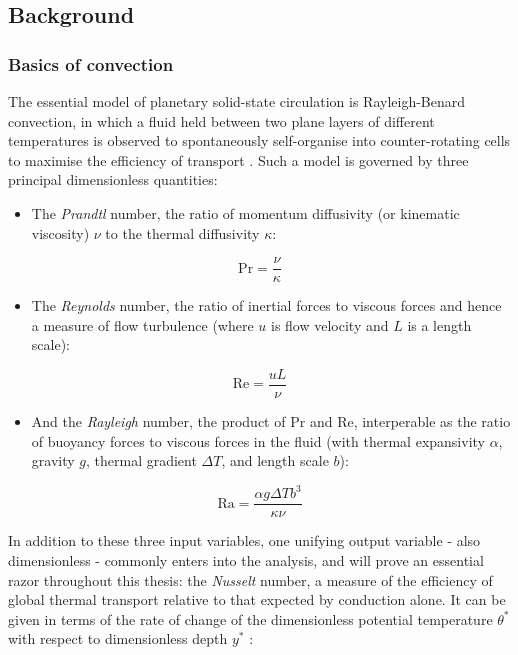 \documentclass[a4paper,11pt,oneside]{book}
\begin{document}
\subsection{Background}

\subsubsection{Basics of convection}

The essential model of planetary solid-state circulation is Rayleigh-Benard convection, in which a fluid held between two plane layers of different temperatures is observed to spontaneously self-organise into counter-rotating cells to maximise the efficiency of transport \cite{Getling1998-gv}. Such a model is governed by three principal dimensionless quantities:

\begin{itemize}
\item The \textit{Prandtl} number, the ratio of momentum diffusivity (or kinematic viscosity) $\nu$ to the thermal diffusivity $\kappa$:
\end{itemize}

\begin{equation}
\mathrm{Pr} = \frac{\nu}{\kappa}
\end{equation}

\begin{itemize}
\item The \textit{Reynolds} number, the ratio of inertial forces to viscous forces and hence a measure of flow turbulence (where $u$ is flow velocity and $L$ is a length scale):
\end{itemize}

\begin{equation}
\mathrm{Re} =\frac{u L}{\nu}
\end{equation}

\begin{itemize}
\item And the \textit{Rayleigh} number, the product of $\mathrm{Pr}$ and $\mathrm{Re}$, interperable as the ratio of buoyancy forces to viscous forces in the fluid (with thermal expansivity $\alpha$, gravity $g$, thermal gradient $\Delta T$, and length scale $b$):
\end{itemize}

\begin{equation}
\mathrm{Ra} = \frac{\alpha g \Delta T b^3}{\kappa \nu}
\end{equation}

In addition to these three input variables, one unifying output variable - also dimensionless - commonly enters into the analysis, and will prove an essential razor throughout this thesis: the \textit{Nusselt} number, a measure of the efficiency of global thermal transport relative to that expected by conduction alone. It can be given in terms of the rate of change of the dimensionless potential temperature $\theta^*$ with respect to dimensionless depth $y^*$ \cite{Schubert2001-ea}:
\end{document}
